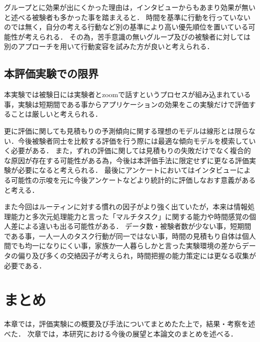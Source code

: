 グループとに効果が出にくかった理由は，インタビューからもあまり効果が無いと述べる被験者も多かった事を踏まえると．
時間を基準に行動を行っていないのでは無く，自分の考える行動など別の基準により高い優先順位を置いている可能性が考えられる．
その為，苦手意識の無いグループ及びの被験者に対しては別のアプローチを用いて行動変容を試みた方が良いと考えられる．
\subsection{本評価実験での限界}
本実験では被験日には実験者とzoomで話すというプロセスが組み込まれている事，実験は短期間である事からアプリケーションの効果をこの実験だけで評価することは厳しいと考えられる．

更に評価に関しても見積もりの予測傾向に関する理想のモデルは線形とは限らない．今後被験者同士を比較する評価を行う際には最適な傾向モデルを模索していく必要がある．
また，ずれの評価に関しては見積もりの失敗だけでなく複合的な原因が存在する可能性がある為，今後は本評価手法に限定せずに更なる評価実験が必要になると考えられる．
最後にアンケートにおいてはインタビューによる可能性の示唆を元に今後アンケートなどより統計的に評価しなおす意義があると考える．

また今回はルーティンに対する慣れの因子がより強く出ていたが，本来は情報処理能力と多次元処理能力と言った「マルチタスク」に関する能力\cite{multitask}や時間感覚\cite{Tayama2018}の個人差による違いも出る可能性がある．
データ数・被験者数が少ない事，短期間である事，一人一人のタスク行動が同一ではない事，時間の見積もり自体は個人間でも均一になりにくい事，家族か一人暮らしかと言った実験環境の差からデータの偏り及び多くの交絡因子が考えられ，時間把握の能力策定には更なる収集が必要である．
\section{まとめ}
本章では，評価実験にの概要及び手法についてまとめたた上で，結果・考察を述べた．
次章では，本研究における今後の展望と本論文のまとめを述べる．
